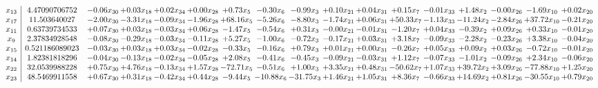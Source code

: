 \documentclass[9pt]{article}
\begin{document}
 \[\begin{array}{c| c c@{\hskip 2pt} c@{\hskip 2pt} c@{\hskip 2pt} c@{\hskip 2pt} c@{\hskip 2pt} c@{\hskip 2pt} c@{\hskip 2pt} c@{\hskip 2pt} c@{\hskip 2pt} c@{\hskip 2pt} c@{\hskip 2pt} c@{\hskip 2pt} c@{\hskip 2pt} c@{\hskip 2pt} c@{\hskip 2pt} }
 x_{13}   &  4.47090706752 & -0.06 x_{30} & +  0.03 x_{18} & +  0.02 x_{34} & +  0.00 x_{28} & +  0.73 x_{5} & -0.30 x_{6} & -0.99 x_{3} & +  0.10 x_{21} & +  0.04 x_{31} & +  0.15 x_{7} & -0.01 x_{33} & +  1.48 x_{2} & -0.00 x_{26} & -1.69 x_{10} & +  0.02 x_{20}\\
 x_{17}   &  11.503640027 & -2.00 x_{30} & -3.31 x_{18} & -0.09 x_{34} & -1.96 x_{28} & + 68.16 x_{5} & -5.26 x_{6} & -8.80 x_{3} & -1.74 x_{21} & +  0.06 x_{31} & + 50.33 x_{7} & -1.13 x_{33} & -11.24 x_{2} & -2.84 x_{26} & + 37.72 x_{10} & -0.21 x_{20}\\
 x_{11}   &  0.63739734533 & +  0.07 x_{30} & +  0.03 x_{18} & -0.03 x_{34} & +  0.06 x_{28} & -1.47 x_{5} & -0.54 x_{6} & +  0.31 x_{3} & -0.00 x_{21} & -0.01 x_{31} & -1.20 x_{7} & +  0.04 x_{33} & -0.39 x_{2} & +  0.09 x_{26} & +  0.33 x_{10} & -0.01 x_{20}\\
 x_{9}   &  2.37834928548 & -0.08 x_{30} & -0.29 x_{18} & -0.03 x_{34} & -0.11 x_{28} & +  5.27 x_{5} & -1.00 x_{6} & -0.72 x_{3} & -0.17 x_{21} & +  0.03 x_{31} & +  3.18 x_{7} & -0.09 x_{33} & -2.28 x_{2} & -0.23 x_{26} & +  3.38 x_{10} & -0.04 x_{20}\\
 x_{15}   &  0.521186089023 & -0.03 x_{30} & +  0.03 x_{18} & +  0.03 x_{34} & -0.02 x_{28} & -0.33 x_{5} & -0.16 x_{6} & +  0.79 x_{3} & +  0.01 x_{21} & +  0.00 x_{31} & -0.26 x_{7} & +  0.05 x_{33} & +  0.09 x_{2} & +  0.03 x_{26} & -0.72 x_{10} & -0.01 x_{20}\\
 x_{14}   &  1.82381818296 & -0.04 x_{30} & -0.13 x_{18} & -0.02 x_{34} & -0.05 x_{28} & +  2.08 x_{5} & -0.41 x_{6} & -0.45 x_{3} & -0.09 x_{21} & -0.03 x_{31} & +  1.12 x_{7} & -0.07 x_{33} & -1.01 x_{2} & -0.09 x_{26} & +  2.34 x_{10} & -0.06 x_{20}\\
 x_{22}   &  32.0539988228 & +  0.75 x_{30} & +  4.76 x_{18} & -0.13 x_{34} & +  1.57 x_{28} & -72.71 x_{5} & -0.51 x_{6} & +  1.00 x_{3} & +  3.35 x_{21} & +  0.48 x_{31} & -50.62 x_{7} & +  1.07 x_{33} & + 39.72 x_{2} & +  3.09 x_{26} & -77.88 x_{10} & +  1.25 x_{20}\\
 x_{23}   &  48.5469911558 & +  0.67 x_{30} & +  0.31 x_{18} & -0.42 x_{34} & +  0.44 x_{28} & -9.44 x_{5} & -10.88 x_{6} & -31.75 x_{3} & +  1.46 x_{21} & +  1.05 x_{31} & +  8.36 x_{7} & -0.66 x_{33} & + 14.69 x_{2} & +  0.81 x_{26} & -30.55 x_{10} & +  0.79 x_{20}\\

\end{array}\]
\end{document}
